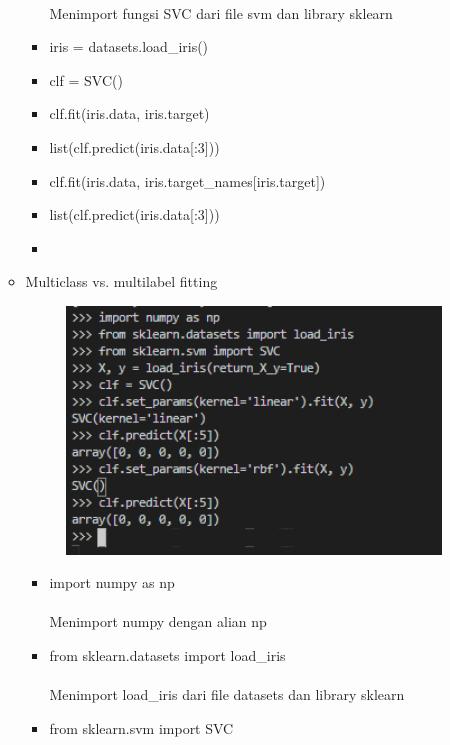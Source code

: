 \documentclass{article}
\begin{document}
\begin{enumerate}
\begin{itemize}
\begin{itemize}
                                \paragraph{}Menimport fungsi SVC dari file svm dan library sklearn
                            \item iris = datasets.load\_iris()
                            \item clf = SVC()
                            \item clf.fit(iris.data, iris.target)
                            \item list(clf.predict(iris.data[:3]))
                            \item clf.fit(iris.data, iris.target\_names[iris.target])
                            \item list(clf.predict(iris.data[:3]))
                            \item 
                        \end{itemize}
                    \item Multiclass vs. multilabel fitting
                        \begin{figure}[ht]
                            \centerline{\includegraphics[width=10cm]{7.PNG}}
                        \end{figure}
                        \begin{itemize}
                            \item import numpy as np
                                \paragraph{}Menimport numpy dengan alian np
                            \item from sklearn.datasets import load\_iris
                                \paragraph{}Menimport load\_iris dari file datasets dan library sklearn
                            \item from sklearn.svm import SVC

\end{itemize}
\end{itemize}
\end{enumerate}
\end{document}
